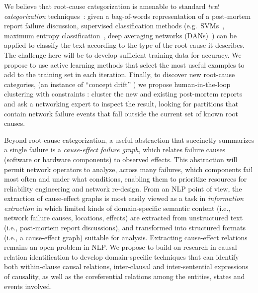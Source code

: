 We believe that root-cause categorization is amenable to standard \emph{text
  categorization} techniques~\cite{Sebastiani:2002:MLA:505282.505283}:
  given a bag-of-words representation of a post-mortem report failure
  {\sc discussion}, supervised classification methods
(e.g.\ SVMs~\cite{Joachims1998}, maximum entropy
classification~\cite{Pang:2002:TUS:1118693.1118704}, deep averaging
networks (DANs)~\cite{Iyyer:Manjunatha:Boyd-Graber:Daume-III-2015})
can be applied to classify the text according to
the type of the root cause it describes.  The challenge here will be to
develop sufficient training data for accuracy. We propose to use
active learning methods
\cite{cohn1996active,mccallumzy1998employing,tong2001support}
that select the most useful
examples to add to the training set in each iteration. Finally, to
discover new root-cause categories, (an instance of ``concept drift''
\cite{widmer1996learning,klinkenberg2000detecting}) we propose
human-in-the-loop clustering with constraints \cite{wagstaff2000clustering,wagstaff2001constrained,cohn2003semi,Mierswa:2006:YRP:1150402.1150531}:
cluster the new and existing post-mortem reports
and ask a networking expert to inspect the result, looking for
partitions that contain network failure events that fall outside the
current set of known root causes.

Beyond root-cause categorization, a useful abstraction that succinctly
summarizes a single failure is a {\it cause-effect failure graph},
which relates failure causes (software or hardware components) to
observed effects. This abstraction will permit network operators to
analyze, across many failures, which components fail most often and
under what conditions, enabling them to prioritize resources for
reliability engineering and network re-design. From an NLP point of
view, the extraction of cause-effect graphs is most easily viewed as a
task in {\it information extraction}
\cite{cardie1997empirical,freitag2000machine,sarawagi2008information}
in which limited kinds of domain-specific semantic content (i.e.,
network failure causes, locations, effects) are extracted from
unstructured text (i.e., post-mortem report {\sc discussion}s), and
transformed into structured formats (i.e., a cause-effect graph)
suitable for analysis. Extracting cause-effect relations remains an
open problem in NLP.  We propose to build on research
\cite{kozareva:2012:TextGraphs-7,oh-EtAl:2013:ACL2013,CAtoCL:2014,mirza-tonelli:2014:Coling,hidey-mckeown:2016:P16-1}
in causal relation identification to develop domain-specific
techniques that can identify both within-clause causal relations,
inter-clausal and inter-sentential expressions of causality, as well
as the coreferential relations among the entities, states and events
involved.

